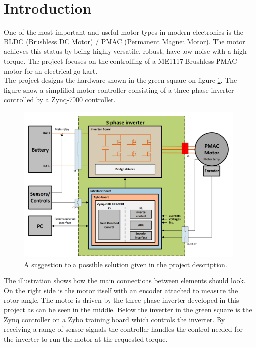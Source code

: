 \section{Introduction}
\label{sec:introduction}
One of the most important and useful motor types in modern electronics is the BLDC (Brushless DC Motor) / PMAC (Permanent Magnet Motor). The motor achieves this status by being highly versatile, robust, have low noise with a high torque. The project focuses on the controlling of a ME1117 Brushless PMAC motor for an electrical go kart. \\

The project designs the hardware shown in the green square on figure \ref{fig:Possiblesolution}. The figure show a simplified motor controller consisting of a three-phase inverter controlled by a Zynq-7000 controller.



\begin{figure} [H]
  \centering
  \includegraphics[width=\linewidth]{pictures/general/Project1.PNG}
  \caption{A suggestion to a possible solution given in the project description. \cite{Project 1. semester - S19}}
  \label{fig:Possiblesolution}
\end{figure}

The illustration shows how the main connections between elements should look. On the right side is the motor itself with an encoder attached to measure the rotor angle. The motor is driven by the three-phase inverter developed in this project as can be seen in the middle. Below the inverter in the green square is the Zynq controller on a Zybo training board which controls the inverter. By receiving a range of sensor signals the controller handles the control needed for the inverter to run the motor at the requested torque.

